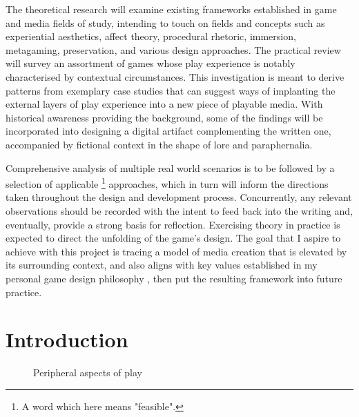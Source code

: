 \documentclass[12pt,oneside]{book}
\begin{document}
\begin{center}
    The theoretical research will examine existing frameworks established in game and media fields of study, intending to touch on fields and concepts such as 
    experiential aesthetics, affect theory, procedural rhetoric, immersion, metagaming, preservation, and various design approaches.
    The practical review will survey an assortment of games whose play experience is notably characterised by contextual circumstances.
    This investigation is meant to derive patterns from exemplary case studies that can suggest ways of implanting the external layers of play experience into a new piece of playable media.
    With historical awareness providing the background, some of the findings will be incorporated into designing a digital artifact complementing the written one, accompanied by fictional context in the shape of lore and paraphernalia.\par
    Comprehensive analysis of multiple real world scenarios is to be followed by a selection of applicable
    \footnote{A word which here means \parencite{asoue} "feasible".} approaches, which in turn will inform the directions taken throughout the design and development process.
    Concurrently, any relevant observations should be recorded with the intent to feed back into the writing and, eventually, provide a strong basis for reflection.
    Exercising theory in practice is expected to direct the unfolding of the game's design.
    The goal that I aspire to achieve with this project is tracing a model of media creation that is elevated by its surrounding context, and also aligns with key values established in my personal game design philosophy \parencite*[GD5609,][]{myDesignPhil}, then put the resulting framework into future practice.
\end{center}
\normalmarginpar\restoregeometry

\chapter{Introduction}
\begin{figure}[ht]\tikzperi
    \caption{Peripheral aspects of play}\label{peri-play}
\end{figure}
    \vfill
    \vfill
    \vfill
\end{document}

